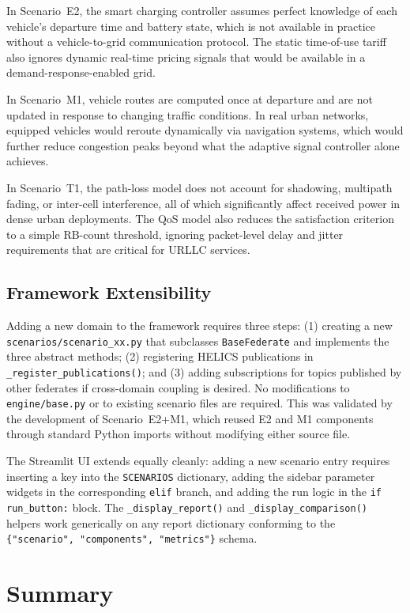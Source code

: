 In Scenario~E2, the smart charging controller assumes perfect knowledge of each vehicle's departure time and battery state, which is not available in practice without a vehicle-to-grid communication protocol. The static time-of-use tariff also ignores dynamic real-time pricing signals that would be available in a demand-response-enabled grid.

In Scenario~M1, vehicle routes are computed once at departure and are not updated in response to changing traffic conditions. In real urban networks, equipped vehicles would reroute dynamically via navigation systems, which would further reduce congestion peaks beyond what the adaptive signal controller alone achieves.

In Scenario~T1, the path-loss model does not account for shadowing, multipath fading, or inter-cell interference, all of which significantly affect received power in dense urban deployments. The QoS model also reduces the satisfaction criterion to a simple RB-count threshold, ignoring packet-level delay and jitter requirements that are critical for URLLC services.

\subsection{Framework Extensibility}

Adding a new domain to the framework requires three steps: (1) creating a new \texttt{scenarios/scenario\_xx.py} that subclasses \texttt{BaseFederate} and implements the three abstract methods; (2) registering HELICS publications in \texttt{\_register\_publications()}; and (3) adding subscriptions for topics published by other federates if cross-domain coupling is desired. No modifications to \texttt{engine/base.py} or to existing scenario files are required. This was validated by the development of Scenario~E2+M1, which reused E2 and M1 components through standard Python imports without modifying either source file.

The Streamlit UI extends equally cleanly: adding a new scenario entry requires inserting a key into the \texttt{SCENARIOS} dictionary, adding the sidebar parameter widgets in the corresponding \texttt{elif} branch, and adding the run logic in the \texttt{if run\_button:} block. The \texttt{\_display\_report()} and \texttt{\_display\_comparison()} helpers work generically on any report dictionary conforming to the \texttt{\{"scenario", "components", "metrics"\}} schema.


\section{Summary}

